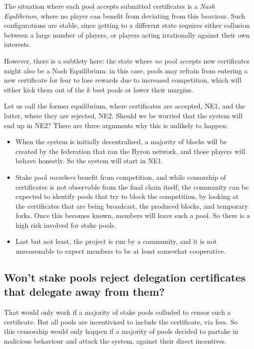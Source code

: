 \documentclass[11pt,a4paper,dvipsnames,twosided]{article}
\begin{document}
The situation where each pool accepts submitted certificates is a \emph{Nash
  Equlibrium}, where no player can benefit from deviating from this beaviour.
Such configurations are stable, since getting to a different state requires
either collusion between a large number of players, or players acting
irrationally against their own interests.

However, there is a subtlety here: the state where \emph{no} pool accepts new
certificates might also be a Nash Equilibrium: in this case, pools may refrain
from entering a new certificate for fear to lose rewards due to increased
competition, which will either kick them out of the \(k\) best pools or lower
their margins.

Let us call the former equilibrium, where certificates are accepted, NE1, and
the latter, where they are rejected, NE2. Should we be worried that the system
will end up in NE2? There are three arguments why this is unlikely to happen:

\begin{itemize}
\item When the system is initially decentralised, a majority of blocks will be
  created by the federation that ran the Byron network, and those players will
  behave honestly. So the system will start in NE1.
\item Stake pool \emph{members} benefit from competition, and while censorship
  of certificates is not observable from the final chain itself, the community
  can be expected to identify pools that try to block the competition, by
  looking at the certificates that are being broadcast, the produced blocks, and
  temporary forks. Once this becomes known, members will leave such a pool. So
  there is a high risk involved for stake pools.
\item Last but not least, the project is run by a community, and it is not
  unreasonable to expect members to be at least somewhat cooperative.
\end{itemize}

\subsection{Won't stake pools reject delegation certificates that delegate away
  from them?}

That would only work if a majority of stake pools colluded to censor such a
certificate. But all pools are incentivised to include the certificate, via
fees. So this censorship would only happen if a majority of pools decided to
partake in malicious behaviour and attack the system, against their direct
incentives.



\end{document}

